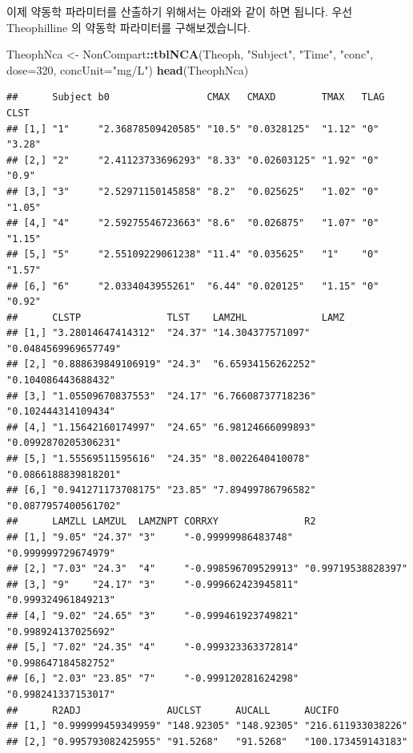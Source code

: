 \documentclass[12pt,]{krantz}
\newenvironment{Shaded}{\begin{snugshade}}{\end{snugshade}}
\newcommand{\KeywordTok}[1]{\textcolor[rgb]{0.13,0.29,0.53}{\textbf{#1}}}
\newcommand{\DataTypeTok}[1]{\textcolor[rgb]{0.13,0.29,0.53}{#1}}
\newcommand{\DecValTok}[1]{\textcolor[rgb]{0.00,0.00,0.81}{#1}}
\newcommand{\StringTok}[1]{\textcolor[rgb]{0.31,0.60,0.02}{#1}}
\newcommand{\OperatorTok}[1]{\textcolor[rgb]{0.81,0.36,0.00}{\textbf{#1}}}
\newcommand{\NormalTok}[1]{#1}
\theoremstyle{definition}
\theoremstyle{definition}
\theoremstyle{definition}
\theoremstyle{remark}
\begin{document}
이제 약동학 파라미터를 산출하기 위해서는 아래와 같이 하면 됩니다. 우선
Theophilline 의 약동학 파라미터를 구해보겠습니다.

\begin{Shaded}
\begin{Highlighting}[]
\NormalTok{TheophNca <-}\StringTok{ }\NormalTok{NonCompart}\OperatorTok{::}\KeywordTok{tblNCA}\NormalTok{(Theoph, }\StringTok{"Subject"}\NormalTok{, }\StringTok{"Time"}\NormalTok{, }\StringTok{"conc"}\NormalTok{, }\DataTypeTok{dose=}\DecValTok{320}\NormalTok{, }\DataTypeTok{concUnit=}\StringTok{"mg/L"}\NormalTok{)}
\KeywordTok{head}\NormalTok{(TheophNca)}
\end{Highlighting}
\end{Shaded}

\begin{verbatim}
##      Subject b0                 CMAX   CMAXD        TMAX   TLAG CLST  
## [1,] "1"     "2.36878509420585" "10.5" "0.0328125"  "1.12" "0"  "3.28"
## [2,] "2"     "2.41123733696293" "8.33" "0.02603125" "1.92" "0"  "0.9" 
## [3,] "3"     "2.52971150145858" "8.2"  "0.025625"   "1.02" "0"  "1.05"
## [4,] "4"     "2.59275546723663" "8.6"  "0.026875"   "1.07" "0"  "1.15"
## [5,] "5"     "2.55109229061238" "11.4" "0.035625"   "1"    "0"  "1.57"
## [6,] "6"     "2.0334043955261"  "6.44" "0.020125"   "1.15" "0"  "0.92"
##      CLSTP               TLST    LAMZHL             LAMZ                
## [1,] "3.28014647414312"  "24.37" "14.304377571097"  "0.0484569969657749"
## [2,] "0.888639849106919" "24.3"  "6.65934156262252" "0.104086443688432" 
## [3,] "1.05509670837553"  "24.17" "6.76608737718236" "0.102444314109434" 
## [4,] "1.15642160174997"  "24.65" "6.98124666099893" "0.0992870205306231"
## [5,] "1.55569511595616"  "24.35" "8.0022640410078"  "0.0866188839818201"
## [6,] "0.941271173708175" "23.85" "7.89499786796582" "0.0877957400561702"
##      LAMZLL LAMZUL  LAMZNPT CORRXY               R2                 
## [1,] "9.05" "24.37" "3"     "-0.99999986483748"  "0.999999729674979"
## [2,] "7.03" "24.3"  "4"     "-0.998596709529913" "0.99719538828397" 
## [3,] "9"    "24.17" "3"     "-0.999662423945811" "0.999324961849213"
## [4,] "9.02" "24.65" "3"     "-0.999461923749821" "0.998924137025692"
## [5,] "7.02" "24.35" "4"     "-0.999323363372814" "0.998647184582752"
## [6,] "2.03" "23.85" "7"     "-0.999120281624298" "0.998241337153017"
##      R2ADJ               AUCLST      AUCALL      AUCIFO            
## [1,] "0.999999459349959" "148.92305" "148.92305" "216.611933038226"
## [2,] "0.995793082425955" "91.5268"   "91.5268"   "100.173459143183"

\end{verbatim}
\end{document}
